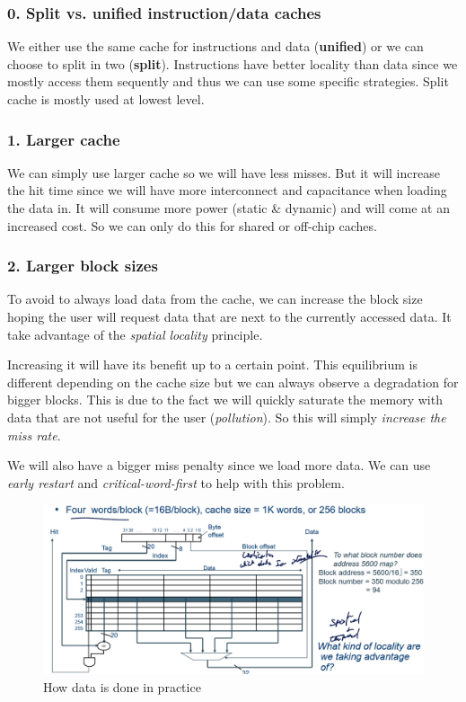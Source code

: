\documentclass{report}
\begin{document}
\subsubsection{0. Split vs. unified instruction/data caches}

We either use the same cache for instructions and data (\textbf{unified}) or we can choose to split in two (\textbf{split}). Instructions have better locality than data since we mostly access them sequently and thus we can use some specific strategies. Split cache is mostly used at lowest level.

\subsubsection{1. Larger cache}

We can simply use larger cache so we will have less misses. But it will increase the hit time since we will have more interconnect and capacitance when loading the data in. It will consume more power (static \& dynamic) and will come at an increased cost. So we can only do this for shared or off-chip caches.

\subsubsection{2. Larger block sizes}

To avoid to always load data from the cache, we can increase the block size hoping the user will request data that are next to the currently accessed data. It take advantage of the \textit{spatial locality} principle. 

Increasing it will have its benefit up to a certain point. This equilibrium is different depending on the cache size but we can always observe a degradation for bigger blocks. This is due to the fact we will quickly saturate the memory with data that are not useful for the user (\textit{pollution}). So this will simply \textit{increase the miss rate}.

We will also have a bigger miss penalty since we load more data. We can use \textit{early restart} and \textit{critical-word-first} to help with this problem.

\begin{figure}[H]
    \centering
    \includegraphics[width=0.85\linewidth]{data_block.png}
    \caption{How data is done in practice}
    \label{fig:data-block-label}
\end{figure}
\end{document}
